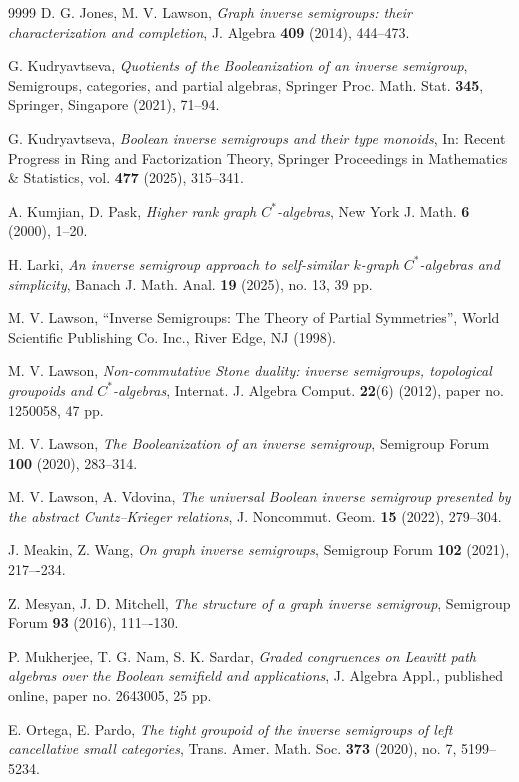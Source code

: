 \documentclass[a4paper,reqno,11pt]{amsart}
\numberwithin{equation}{section}
\theoremstyle{definition}
\theoremstyle{remark}
\begin{document}
\begin{thebibliography}{9999}
D. G. Jones, M. V. Lawson, \emph{Graph inverse semigroups: their characterization and completion}, J. Algebra \textbf{409} (2014), 444--473.

G. Kudryavtseva, \emph{Quotients of the Booleanization of an inverse semigroup}, Semigroups, categories, and partial algebras, Springer Proc. Math. Stat. \textbf{345}, Springer, Singapore (2021), 71--94.

G. Kudryavtseva, \emph{Boolean inverse semigroups and their type monoids}, In: Recent Progress in Ring and Factorization Theory, Springer Proceedings in Mathematics \& Statistics, vol. \textbf{477} (2025), 315--341. 

A. Kumjian, D. Pask, \emph{Higher rank graph $C^*$-algebras}, New York J. Math. \textbf{6} (2000), 1--20.

H. Larki, \emph{An inverse semigroup approach to self-similar $k$-graph $C^*$-algebras and simplicity}, Banach J. Math. Anal. \textbf{19} (2025), no. 13, 39 pp.

M. V. Lawson, ``Inverse Semigroups: The Theory of Partial Symmetries'', World Scientific Publishing Co. Inc., River Edge, NJ (1998). 

M. V. Lawson, \emph{Non-commutative Stone duality: inverse semigroups, topological groupoids and $C^*$-algebras}, Internat. J. Algebra Comput. \textbf{22}(6) (2012), paper no. 1250058, 47 pp. 

M. V. Lawson, \emph{The Booleanization of an inverse semigroup}, Semigroup Forum \textbf{100} (2020), 283--314.

M. V. Lawson, A. Vdovina, \emph{The universal Boolean inverse semigroup presented by the abstract Cuntz--Krieger relations}, J. Noncommut. Geom. \textbf{15} (2022), 279--304.

J. Meakin, Z. Wang, \textit{On graph inverse semigroups}, Semigroup Forum \textbf{102} (2021), 217–-234.		
        
Z. Mesyan, J. D. Mitchell, \textit{The structure of a graph inverse semigroup}, Semigroup Forum \textbf{93} (2016), 111–-130.

P. Mukherjee, T. G. Nam, S. K. Sardar, \emph{Graded congruences on Leavitt path algebras over the Boolean semifield and applications}, J. Algebra Appl., published online, paper no. 2643005, 25 pp.

E. Ortega, E. Pardo, \emph{The tight groupoid of the inverse semigroups of left cancellative small categories}, Trans. Amer. Math. Soc. \textbf{373} (2020), no. 7, 5199--5234.


\end{thebibliography}
\end{document}
